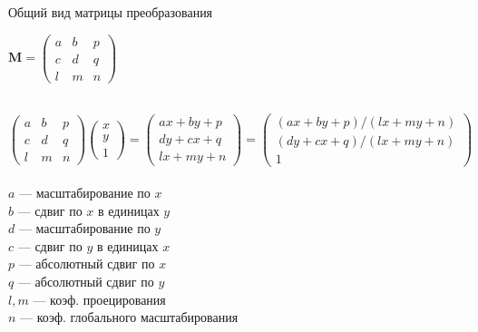 \documentclass[10pt]{beamer}
\begin{document}
\begin{frame}{Общий вид матрицы преобразования}
	
	{
		\centering
		
		$   \textbf{M}=
		\begin{pmatrix}
			a&b&p\\
			c&d&q\\
			l&m&n
		\end{pmatrix}
		$ \\ ~ \\
	}
	

		$
		\begin{pmatrix}
			a&b&p\\
			c&d&q\\
			l&m&n
		\end{pmatrix}
		\begin{pmatrix}
			x\\
			y\\
			1
		\end{pmatrix}
		=
		\begin{pmatrix}
			ax+by+p \\
			dy+cx+q \\
			lx+my+n
		\end{pmatrix}
		=
		\begin{pmatrix}
			(ax+by+p)/(lx+my+n) \\
			(dy+cx+q)/(lx+my+n) \\
			1
		\end{pmatrix}		
		$ \\ ~ \\

		$a$ --- масштабирование по $x$ \\
		$b$ --- сдвиг по $x$ в единицах $y$\\
		$d$ --- масштабирование по $y$\\
		$c$ --- сдвиг по $y$ в единицах $x$ \\
		$p$ --- абсолютный сдвиг по $x$ \\
		$q$ --- абсолютный сдвиг по $y$ \\
		$l,m$ --- коэф. проецирования \\
		$n$ --- коэф. глобального масштабирования
	

	
	
\end{frame}
\end{document}
